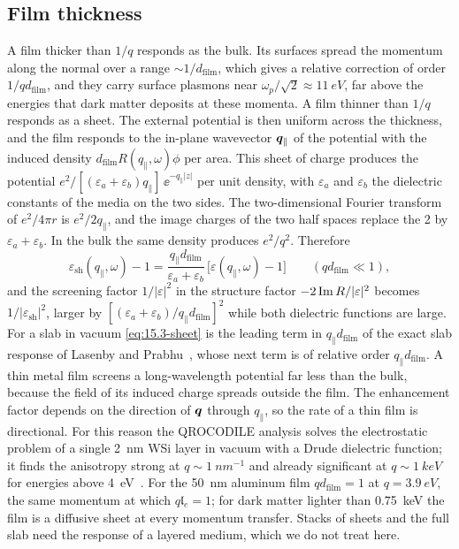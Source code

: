 \subsection{Film thickness}\label{sec:15.3-sheet}

A film thicker than $1/q$ responds as the bulk. Its surfaces spread the momentum along the normal over a range $\sim 1/d_{\mathrm{film}}$, which gives a relative correction of order $1/qd_{\mathrm{film}}$, and they carry surface plasmons near $\omega_p/\sqrt2 \approx \SI{11}{eV}$, far above the energies that dark matter deposits at these momenta. A film thinner than $1/q$ responds as a sheet. The external potential is then uniform across the thickness, and the film responds to the in-plane wavevector $\bm{q}_\parallel$ of the potential with the induced density $d_{\mathrm{film}}R(q_\parallel,\omega)\phi$ per area. This sheet of charge produces the potential $e^2/[(\varepsilon_a + \varepsilon_b)q_\parallel]\,\ee^{-q_\parallel|z|}$ per unit density, with $\varepsilon_a$ and $\varepsilon_b$ the dielectric constants of the media on the two sides. The two-dimensional Fourier transform of $e^2/4\pi r$ is $e^2/2q_\parallel$, and the image charges of the two half spaces replace the 2 by $\varepsilon_a + \varepsilon_b$. In the bulk the same density produces $e^2/q^2$. Therefore
\begin{equation}
  \varepsilon_{\mathrm{sh}}(q_\parallel,\omega) - 1 = \frac{q_\parallel d_{\mathrm{film}}}{\varepsilon_a + \varepsilon_b}\,\bigl[\varepsilon(q_\parallel,\omega) - 1\bigr] \qquad (qd_{\mathrm{film}} \ll 1) ,
  \label{eq:15.3-sheet}
\end{equation}
and the screening factor $1/|\varepsilon|^2$ in the structure factor $-2\operatorname{Im} R/|\varepsilon|^2$ becomes $1/|\varepsilon_{\mathrm{sh}}|^2$, larger by $[(\varepsilon_a + \varepsilon_b)/q_\parallel d_{\mathrm{film}}]^2$ while both dielectric functions are large. For a slab in vacuum \cref{eq:15.3-sheet} is the leading term in $q_\parallel d_{\mathrm{film}}$ of the exact slab response of Lasenby and Prabhu~\cite[Eq.~(19)]{lasenby2022dark}, whose next term is of relative order $q_\parallel d_{\mathrm{film}}$. A thin metal film screens a long-wavelength potential far less than the bulk, because the field of its induced charge spreads outside the film. The enhancement factor depends on the direction of $\bm{q}$ through $q_\parallel$, so the rate of a thin film is directional. For this reason the QROCODILE analysis solves the electrostatic problem of a single \SI{2}{nm} WSi layer in vacuum with a Drude dielectric function; it finds the anisotropy strong at $q \sim \SI{1}{nm^{-1}}$ and already significant at $q \sim \SI{1}{keV}$ for energies above \SI{4}{eV}~\cite[supplement]{baudis2025first}. For the \SI{50}{nm} aluminum film $qd_{\mathrm{film}} = 1$ at $q = \SI{3.9}{eV}$, the same momentum at which $q\mathfrak{l}_e = 1$; for dark matter lighter than \SI{0.75}{keV} the film is a diffusive sheet at every momentum transfer. Stacks of sheets and the full slab need the response of a layered medium, which we do not treat here.

